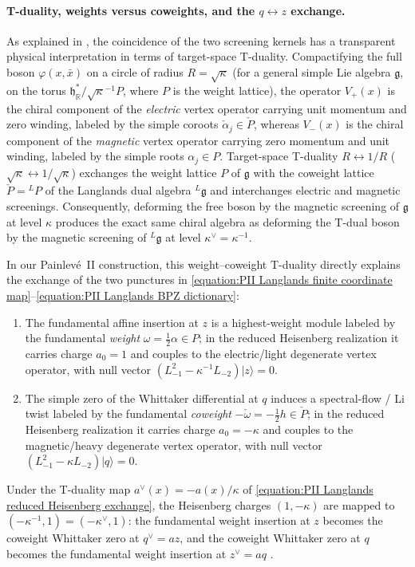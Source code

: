\documentclass[a4paper,11pt]{article}
\numberwithin{equation}{section}
\begin{document}
\paragraph{T-duality, weights versus coweights, and the $q\leftrightarrow z$ exchange.}
As explained in \cite[Section~8.6]{Frenkel2005LanglandsLectures}, the coincidence of the two screening kernels has a transparent physical interpretation in terms of target-space T-duality. Compactifying the full boson $\varphi(x,\bar{x})$ on a circle of radius $R=\sqrt{\kappa}$ (for a general simple Lie algebra $\mathfrak{g}$, on the torus $\mathfrak{h}_{\mathbb{R}}^{*}/\sqrt{\kappa}^{-1}P$, where $P$ is the weight lattice), the operator $V_{+}(x)$ is the chiral component of the \emph{electric} vertex operator carrying unit momentum and zero winding, labeled by the simple coroots $\check{\alpha}_{j}\in\check{P}$, whereas $V_{-}(x)$ is the chiral component of the \emph{magnetic} vertex operator carrying zero momentum and unit winding, labeled by the simple roots $\alpha_{j}\in P$. Target-space T-duality $R\leftrightarrow 1/R$ ($\sqrt{\kappa}\leftrightarrow 1/\sqrt{\kappa}$) exchanges the weight lattice $P$ of $\mathfrak{g}$ with the coweight lattice $\check{P}={}^{L}P$ of the Langlands dual algebra ${}^{L}\mathfrak{g}$ and interchanges electric and magnetic screenings. Consequently, deforming the free boson by the magnetic screening of $\mathfrak{g}$ at level $\kappa$ produces the exact same chiral algebra as deforming the T-dual boson by the magnetic screening of ${}^{L}\mathfrak{g}$ at level $\kappa^{\vee}=\kappa^{-1}$.

In our Painlev\'e~II construction, this weight--coweight T-duality directly explains the exchange of the two punctures in \eqref{equation:PII Langlands finite coordinate map}--\eqref{equation:PII Langlands BPZ dictionary}:
\begin{enumerate}
	\item The fundamental affine insertion at $z$ is a highest-weight module labeled by the fundamental \emph{weight} $\omega=\frac{1}{2}\alpha\in P$; in the reduced Heisenberg realization it carries charge $a_{0}=1$ and couples to the electric/light degenerate vertex operator, with null vector $(L_{-1}^{2}-\kappa^{-1}L_{-2})|z\rangle=0$.
	\item The simple zero of the Whittaker differential at $q$ induces a spectral-flow / Li twist labeled by the fundamental \emph{coweight} $-\check{\omega}=-\frac{1}{2}h\in\check{P}$; in the reduced Heisenberg realization it carries charge $a_{0}=-\kappa$ and couples to the magnetic/heavy degenerate vertex operator, with null vector $(L_{-1}^{2}-\kappa L_{-2})|q\rangle=0$.
\end{enumerate}
Under the T-duality map $a^{\vee}(x)=-a(x)/\kappa$ of \eqref{equation:PII Langlands reduced Heisenberg exchange}, the Heisenberg charges $(1,-\kappa)$ are mapped to $(-\kappa^{-1},1)=(-\kappa^{\vee},1)$: the fundamental weight insertion at $z$ becomes the coweight Whittaker zero at $q^{\vee}=az$, and the coweight Whittaker zero at $q$ becomes the fundamental weight insertion at $z^{\vee}=aq$ \cite{ArakawaFrenkel2019}.
\end{document}
